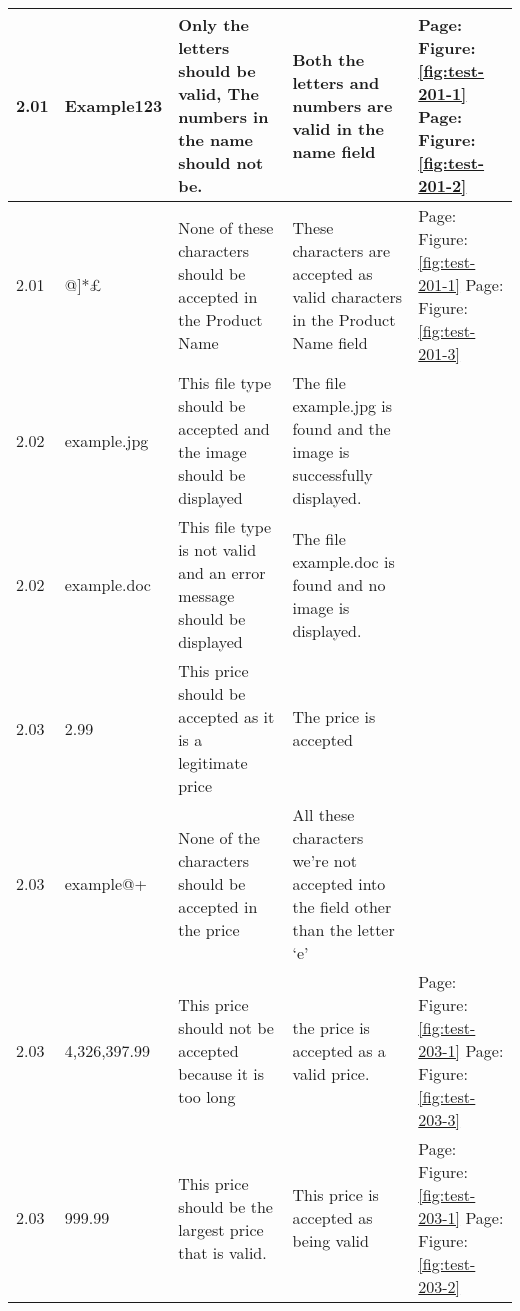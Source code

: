 \begin{flushleft}
\begin{longtable}{|p{1.0cm}|p{2.5cm}|p{3cm}|p{3.0cm}|p{2.5cm}|}
	2.01 & Example123 & Only the letters should be valid, The numbers in the name should not be. & Both the letters and numbers are valid in the name field  & Page:\pageref{fig:test-201-1}  \newline Figure:\ref{fig:test-201-1} \newline \newline Page:\pageref{fig:test-201-2}  \newline Figure:\ref{fig:test-201-2}\\ \hline 
	2.01 &  @]*£  & None of these characters should be accepted in the Product Name & These characters are accepted as valid characters in the Product Name field& Page:\pageref{fig:test-201-1}  \newline Figure:\ref{fig:test-201-1} \newline \newline Page:\pageref{fig:test-201-3}  \newline Figure:\ref{fig:test-201-3} \\ \hline 
	2.02 & example.jpg & This file type should be accepted and the image should be displayed & The file example.jpg is found and the image is successfully displayed. & \\ \hline
	2.02 & example.doc & This file type is not valid and an error message should be displayed & The file example.doc is found and no image is displayed. &\\ \hline
	2.03 & 2.99 & This price should be accepted as it is a legitimate price & The price is accepted & \\ \hline
	2.03 &  example@+ & None of the characters should be accepted in the price & All these characters we're not accepted into the field other than the letter `e' &\\ \hline
	2.03 & 4,326,397.99 & This price should not be accepted because it is too long& the price is accepted as a valid price. & Page: \pageref{fig:test-203-1} \newline Figure: \ref{fig:test-203-1} \newline \newline Page: \pageref{fig:test-203-3} \newline Figure: \ref{fig:test-203-3} \\ \hline
	2.03 & 999.99 & This price should be the largest price that is valid.& This price is accepted as being valid & Page: \pageref{fig:test-203-1} \newline Figure: \ref{fig:test-203-1} \newline \newline Page: \pageref{fig:test-203-2} \newline Figure: \ref{fig:test-203-2}\\ \hline

\end{longtable}
\end{flushleft}
